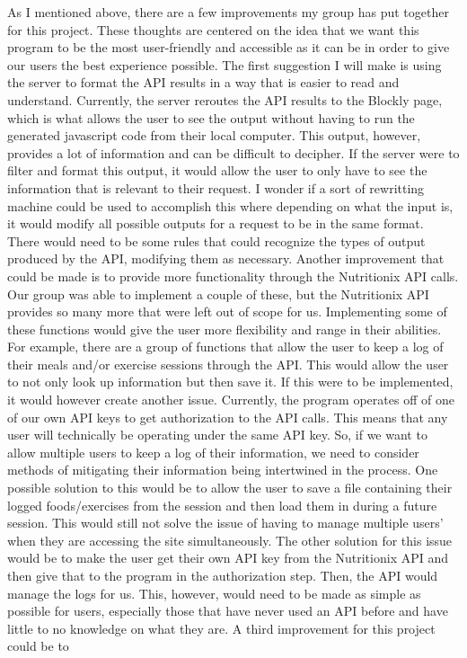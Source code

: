 \documentclass{article}
\theoremstyle{theorem}
\theoremstyle{definition}
\theoremstyle{remark}
\begin{document}
As I mentioned above, there are a few improvements my group has put together for this project. These thoughts are centered on the idea that we want this program to be the most user-friendly and accessible as it can be in order to give our users the best experience possible. The first suggestion I will make is using the server to format the API results 
in a way that is easier to read and understand. Currently, the server reroutes the API results to the Blockly page, which is what allows the user to see the output without having to run the generated javascript code from their local computer. This output, however, provides a lot of information and can be difficult to decipher. If the server were to filter 
and format this output, it would allow the user to only have to see the information that is relevant to their request. I wonder if a sort of rewritting machine could be used to accomplish this where depending on what the input is, it would modify all possible outputs for a request to be in the same format. There would need to be some rules that could recognize 
the types of output produced by the API, modifying them as necessary. Another improvement that could be made is to provide more functionality through the Nutritionix API calls. Our group was able to implement a couple of these, but the Nutritionix API provides so many more that were left out of scope for us. Implementing some of these functions would 
give the user more flexibility and range in their abilities. For example, there are a group of functions that allow the user to keep a log of their meals and/or exercise sessions through the API. This would allow the user to not only look up information but then save it. If this were to be implemented, it would however create another issue. Currently, the 
program operates off of one of our own API keys to get authorization to the API calls. This means that any user will technically be operating under the same API key. So, if we want to allow multiple users to keep a log of their information, we need to consider methods of mitigating their information being intertwined in the process. One possible solution 
to this would be to allow the user to save a file containing their logged foods/exercises from the session and then load them in during a future session. This would still not solve the issue of having to manage multiple users' when they are accessing the site simultaneously. The other solution for this issue would be to make the user get their own API key 
from the Nutritionix API and then give that to the program in the authorization step. Then, the API would manage the logs for us. This, however, would need to be made as simple as possible for users, especially those that have never used an API before and have little to no knowledge on what they are. A third improvement for this project could be to 
\end{document}
